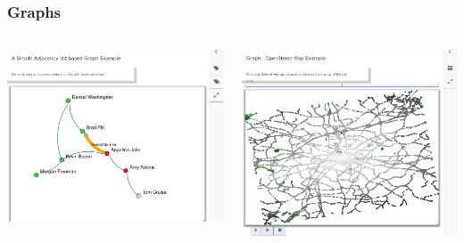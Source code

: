 \documentclass[aspectratio=169]{beamer}
\begin{document}
\begin{frame}
  \frametitle{Graphs}
  \begin{columns}
    \includegraphics[width=1\linewidth]{viz_figs/Graph1.png}

    \includegraphics[width=1\linewidth]{viz_figs/Graph2.png}
  \end{columns}  
\end{frame}
\end{document}
